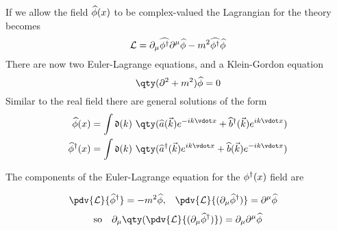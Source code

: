 If we allow the field ${\widehat{\phi}}(x)$ to be complex-valued the
Lagrangian for the theory becomes
\begin{equation}
  \label{eq:40}
  \mathcal{L} = \partial_{\mu} {\widehat{\phi^{\dagger}}} \partial^{\mu} {\widehat{\phi}} - m^2 {\widehat{\phi^{\dagger}}} {\widehat{\phi}}
\end{equation}
There are now two Euler-Lagrange equations, and a Klein-Gordon equation
\begin{equation}
  \label{eq:41}
  \qty( \partial^2 +m^2 ) \Op{\phi} = 0
\end{equation}
Similar to the real field there are general solutions of the form 
\begin{subequations}
  \begin{align}
    \label{eq:42}
    \Op{\phi}(x) &= \int \nm{k} \qty( \Op{a}(\vec{k}) e^{-i k \vdot x} + \hOp{b}(\vec{k}) e^{i k \vdot x} )\\
    \hOp{\phi}(x) &= \int \nm{k} \qty( \hOp{a}(\vec{k}) e^{i k \vdot x} + \Op{b}(\vec{k}) e^{-i k \vdot x} )
  \end{align}
\end{subequations}
\begin{derivation}
  The components of the Euler-Lagrange equation for the $\phi^{\dagger}(x)$ field are

  \begin{align*}
    \pdv{\Lag}{\hOp{\phi}} &= -m^2 \Op{\phi}, & \pdv{\Lag}{(\partial_{\mu} \hOp{\phi})} &= \partial^{\mu} \Op{\phi} 
  \end{align*}
\begin{equation}
  \text{so} \quad \partial_{\mu} \qty(  \pdv{\Lag}{(\partial_{\mu} \hOp{\phi})} ) = \partial_{\mu} \partial^{\mu} \Op{\phi}
  \end{equation}
\end{derivation}

